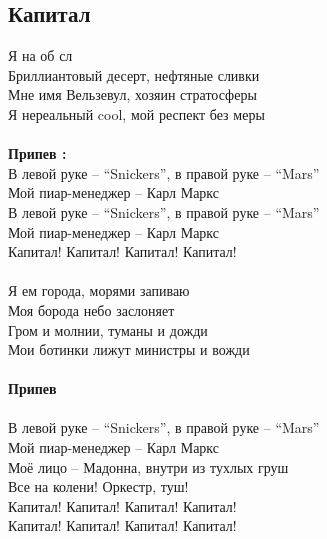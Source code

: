 \documentclass[fleqn,a5paper,12pt,twoside]{guitartabs}
\begin{document}
\subsection*{Капитал}
    Я  на об  сл\\
    Бриллиантовый десерт, нефтяные сливки\\
    Мне имя Вельзевул, хозяин стратосферы\\
    Я нереальный cool, мой респект без меры\\
    \\
    \-\hspace{10mm}\textbf{Припев :}\\  
    \-\hspace{10mm}В левой руке -- ``Snickers'', в правой руке -- ``Mars''\\
    \-\hspace{10mm}Мой пиар-менеджер -- Карл Маркс\\
    \-\hspace{10mm}В левой руке -- ``Snickers'', в правой руке -- ``Mars''\\
    \-\hspace{10mm}Мой пиар-менеджер -- Карл Маркс\\
    \-\hspace{10mm}Капитал! Капитал! Капитал! Капитал!\\
    \\
    Я ем города, морями запиваю\\
    Моя борода небо заслоняет\\
    Гром и молнии, туманы и дожди\\
    Мои ботинки лижут министры и вожди\\
    \\
    \-\hspace{10mm}\textbf{Припев}\\  
    \\
    \-\hspace{10mm}В левой руке -- ``Snickers'', в правой руке -- ``Mars''\\
    \-\hspace{10mm}Мой пиар-менеджер -- Карл Маркс\\
    \-\hspace{10mm}Моё лицо -- Мадонна, внутри из тухлых груш\\
    \-\hspace{10mm}Все на колени! Оркестр, туш!\\
    \-\hspace{10mm}Капитал! Капитал! Капитал! Капитал!\\
    \-\hspace{10mm}Капитал! Капитал! Капитал! Капитал!\\
\newpage
{}%
\end{document}
